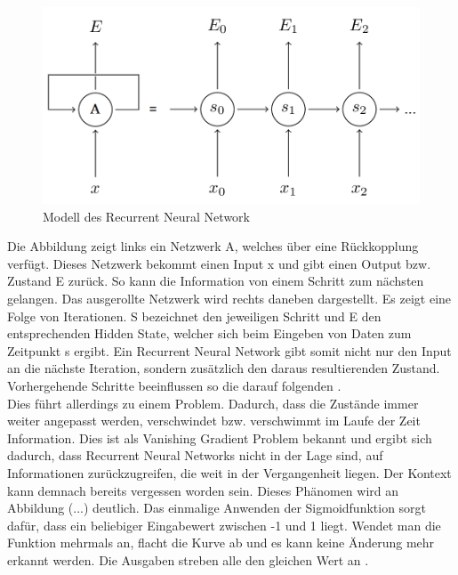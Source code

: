 \begin{figure}[h!]
	\centering
	\includegraphics[width=0.8\linewidth]{images/rnn}
	\caption{Modell des Recurrent Neural Network  \cite{GonzalezDominguez.2015}} %
	\label{fig:topology}
\end{figure}

Die Abbildung zeigt links ein Netzwerk A, welches über eine Rückkopplung verfügt. Dieses Netzwerk bekommt einen Input x und gibt einen Output bzw. Zustand E zurück. So kann die Information von einem Schritt zum nächsten gelangen. Das ausgerollte Netzwerk wird rechts daneben dargestellt. Es zeigt eine Folge von Iterationen. S bezeichnet den jeweiligen Schritt und E den entsprechenden Hidden State, welcher sich beim Eingeben von Daten zum Zeitpunkt s ergibt. Ein Recurrent Neural Network gibt somit nicht nur den Input an die nächste Iteration, sondern zusätzlich den daraus resultierenden Zustand. Vorhergehende Schritte beeinflussen so die darauf folgenden {\cite{Yu.2014}}. 
\\
Dies führt allerdings zu einem Problem. Dadurch, dass die Zustände immer weiter angepasst werden, verschwindet bzw. verschwimmt im Laufe der Zeit Information. Dies ist als Vanishing Gradient Problem bekannt und ergibt sich dadurch, dass Recurrent Neural Networks nicht in der Lage sind, auf Informationen zurückzugreifen, die weit in der Vergangenheit liegen. Der Kontext kann demnach bereits vergessen worden sein. Dieses Phänomen wird an Abbildung (...) deutlich. Das einmalige Anwenden der Sigmoidfunktion sorgt dafür, dass ein beliebiger Eingabewert zwischen -1 und 1 liegt. Wendet man die Funktion mehrmals an, flacht die Kurve ab und es kann keine Änderung mehr erkannt werden. Die Ausgaben streben alle den gleichen Wert an {\cite{deeplearning4j}}.

